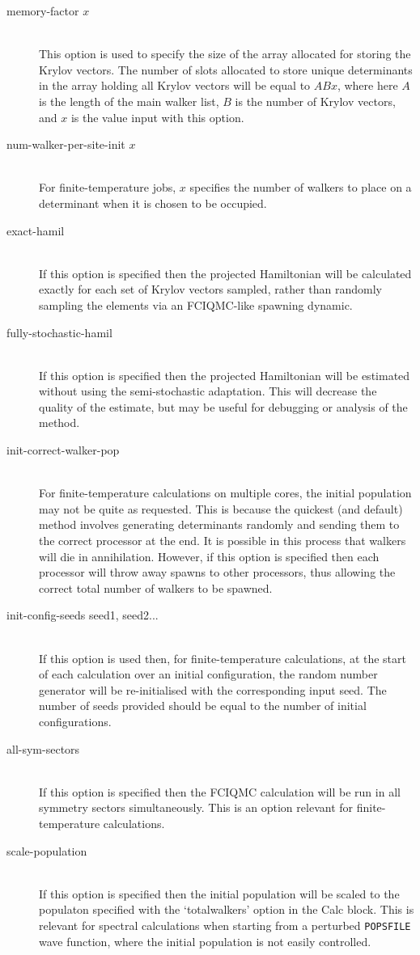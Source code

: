 \documentclass[a4paper,notitlepage]{scrreprt}
\newcommand\codeitem[1]{\needspace{1.5\baselineskip}\item[\textnormal{\ttfamily #1 \nopagebreak}] \hfill \\ \nopagebreak}
\let\code\lstinline
\begin{document}
\begin{description}
        \codeitem{memory-factor $x$}
            This option is used to specify the size of the array allocated for
            storing the Krylov vectors. The number of slots allocated to store
            unique determinants in the array holding all Krylov vectors will be
            equal to $ABx$, where here $A$ is the length of the main walker
            list, $B$ is the number of Krylov vectors, and $x$ is the value input
            with this option.
        \codeitem{num-walker-per-site-init $x$}
            For finite-temperature jobs, $x$ specifies the number of walkers to
            place on a determinant when it is chosen to be occupied.
        \codeitem{exact-hamil}
            If this option is specified then the projected Hamiltonian will
            be calculated exactly for each set of Krylov vectors sampled,
            rather than randomly sampling the elements via an FCIQMC-like
            spawning dynamic.
        \codeitem{fully-stochastic-hamil}
            If this option is specified then the projected Hamiltonian will be
            estimated without using the semi-stochastic adaptation. This will
            decrease the quality of the estimate, but may be useful for
            debugging or analysis of the method.
        \codeitem{init-correct-walker-pop}
            For finite-temperature calculations on multiple cores, the initial
            population may not be quite as requested. This is because the
            quickest (and default) method involves generating determinants
            randomly and sending them to the correct processor at the end. It
            is possible in this process that walkers will die in annihilation.
            However, if this option is specified then each processor will throw
            away spawns to other processors, thus allowing the correct total
            number of walkers to be spawned.
        \codeitem{init-config-seeds seed1, seed2...}
            If this option is used then, for finite-temperature calculations,
            at the start of each calculation over an initial configuration,
            the random number generator will be re-initialised with the
            corresponding input seed. The number of seeds provided should be
            equal to the number of initial configurations.
        \codeitem{all-sym-sectors}
            If this option is specified then the FCIQMC calculation will be
            run in all symmetry sectors simultaneously. This is an option
            relevant for finite-temperature calculations.
        \codeitem{scale-population}
            If this option is specified then the initial population will be
            scaled to the populaton specified with the `totalwalkers' option
            in the Calc block. This is relevant for spectral calculations when
            starting from a perturbed \code{POPSFILE} wave function, where the
            initial population is not easily controlled.
    \end{description}
\end{document}
